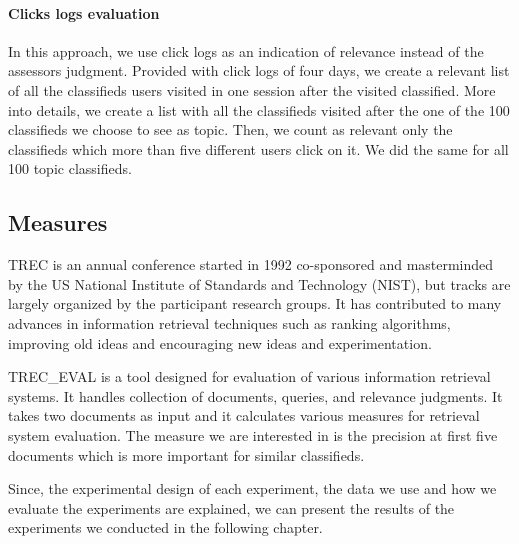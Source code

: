 \paragraph{Clicks logs evaluation}

In this approach, we use click logs as an indication of relevance instead of the assessors judgment. Provided with click logs of four days, we create a relevant list of all the classifieds users visited in one session after the visited classified. More into details, we create a list with all the classifieds visited after the one of the 100 classifieds we choose to see as topic. Then, we count as relevant only the classifieds which more than five different users click on it. We did the same for all 100 topic classifieds.



\subsection{Measures}

TREC is an annual conference started in 1992 co-sponsored and masterminded by the US National Institute of Standards and Technology (NIST), but tracks are largely organized by the participant research groups. It has contributed to many advances in information retrieval techniques such as ranking algorithms, improving old ideas and encouraging new ideas and experimentation.

TREC\_EVAL is a tool designed for evaluation of various information retrieval systems. It handles collection of documents, queries, and relevance judgments. It takes two documents as input and it calculates various measures for retrieval system evaluation. The measure we are interested in is the precision at first five documents which is more important for similar classifieds.



Since, the experimental design of each experiment, the data we use and how we evaluate the experiments are explained, we can present the results of the experiments we conducted in the following chapter.